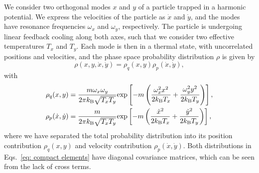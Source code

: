 We consider two orthogonal modes $x$ and $y$ of a particle trapped in a harmonic potential. We express the velocities of the particle as $\dot{x}$ and $\dot{y}$, and the modes have resonance frequencies $\omega_x$ and $\omega_y$, respectively.
The particle is undergoing linear feedback cooling along both axes, such that we consider two effective temperatures $T_x$ and $T_y$.
Each mode is then in a thermal state, with uncorrelated positions and velocities, and the phase space probability distribution $\rho$ is given by
%
\begin{equation}
\label{eq: compact initial thermal state}
\rho(x, y, \dot{x}, \dot{y}) = \rho_q(x, y) \rho_p(\dot{x}, \dot{y}),
\end{equation}
%
with
\begin{subequations}
\label{eq: compact elements}
\begin{align}
\rho_q(x, y) &= \frac{m\omega_x \omega_y}{2\pi \kb \sqrt{T_x T_y}} \exp{- m\left( \frac{\omega_x^2 x^2}{2\kb T_x} + \frac{\omega_y^2 y^2}{2\kb T_y} \right)}, \\
%
%
\rho_p(\dot{x}, \dot{y}) &= \frac{m}{2\pi \kb \sqrt{T_x T_y}} \exp{- m\left( \frac{\dot{x}^2}{2\kb T_x} + \frac{\dot{y}^2}{2\kb T_y} \right)},
\end{align}
\end{subequations}
%
where we have separated the total probability distribution into its position contribution $\rho_q(x, y)$ and velocity contribution $\rho_p(\dot{x}, \dot{y})$. Both distributions in Eqs.~\eqref{eq: compact elements} have diagonal covariance matrices, which can be seen from the lack of cross terms.

